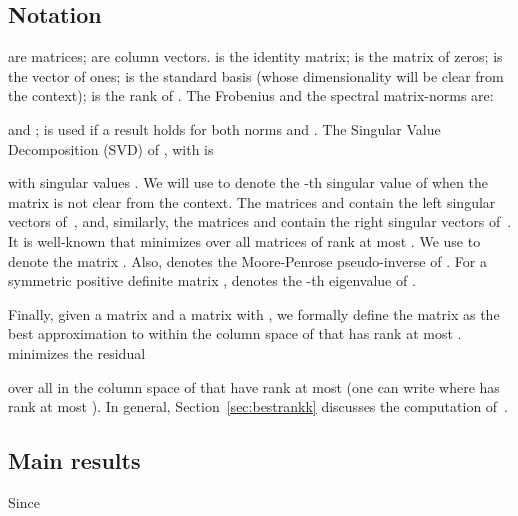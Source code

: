 \subsection{Notation}\label{sxn:notation}

\math{\matA,\matB,\ldots} are matrices; \math{\a,\b,\ldots} are
column vectors.  is the 
identity matrix;   is the  matrix of zeros;  is the  vector of ones;  is the standard basis (whose dimensionality will be clear from the context);  is the rank of .
The Frobenius and the spectral matrix-norms are:

and ;
  is used if a result holds for
both norms  and .
The Singular Value Decomposition (SVD) of
, with  is

with singular values .
We will use  to denote the -th
singular value of  when the matrix is not clear from the context.
The matrices
 and  contain the left singular vectors of~, and, similarly, the matrices  and  contain the right singular vectors of~. It is well-known that  minimizes \math{\XNorm{\matA - \matX}} over all
matrices  of rank at most . We use  to denote the matrix . Also,
 denotes the Moore-Penrose pseudo-inverse of .
For a symmetric positive definite matrix ,  denotes the -th eigenvalue of .

Finally, given a matrix  and a matrix  with , we formally define the matrix  as the best approximation to  within the column space of  that has rank at most
.  
minimizes the residual

over all
\math{\hat\matA} in the column space of
\math{\matC} that have rank at most  (one can write
 where
 has rank at most ).
In general,  Section~\ref{sec:bestrankk} discusses the computation of~.





\subsection{Main results}\label{sec:main0}

Since

